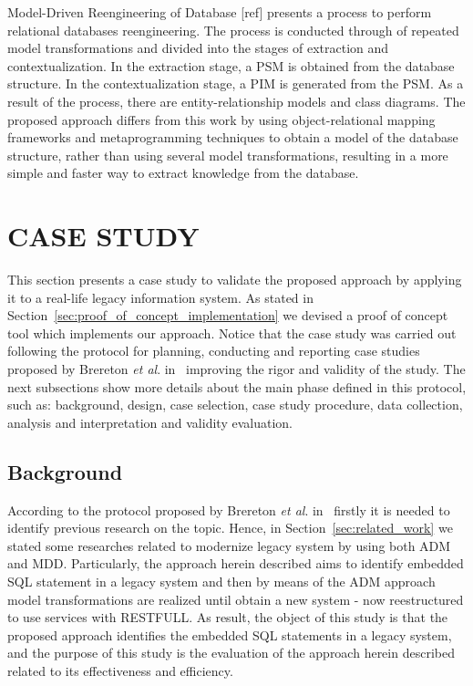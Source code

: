 \documentclass[a4paper,twoside]{article}
\begin{document}
Model-Driven Reengineering of Database [ref] presents a process to perform relational databases reengineering. The process is conducted through of repeated model transformations and divided into the stages of extraction and contextualization. In the extraction stage, a PSM is obtained from the database structure. In the contextualization stage, a PIM is generated from the PSM. As a result of the process, there are entity-relationship models and class diagrams. The proposed approach differs from this work by using object-relational mapping frameworks and metaprogramming techniques to obtain a model of the database structure, rather than using several model transformations, resulting in a more simple and faster way to extract knowledge from the database.


\section{\uppercase{Case Study}}

This section presents a case study to validate the proposed approach by applying it to a real-life legacy information system. As stated in Section~\ref{sec:proof_of_concept_implementation} we devised a proof of concept tool which implements our approach. Notice that the case study was carried out following the protocol for planning, conducting and reporting case studies proposed by Brereton \textit{et al}. in~\cite{case-study-template-2008} improving the rigor and validity of the study. The next subsections show more details about the main phase defined in this protocol, such as: background, design, case selection, case study procedure, data collection, analysis and interpretation and validity evaluation.


\subsection{Background} %
\label{sub:background_case_study}

According to the protocol proposed by Brereton \textit{et al}. in~\cite{case-study-template-2008} firstly it is needed to identify previous research on the topic. Hence, in Section~\ref{sec:related_work} we stated some researches related to modernize legacy system by using both ADM and MDD. Particularly, the approach herein described aims to identify embedded SQL statement in a legacy system and then by means of the ADM approach model transformations are realized until obtain a new system - now reestructured to use services with RESTFULL. As result, the object of this study is that the proposed approach identifies the embedded SQL statements in a legacy system, and the purpose of this study is the evaluation of the approach herein described related to its effectiveness and efficiency.
\end{document}
